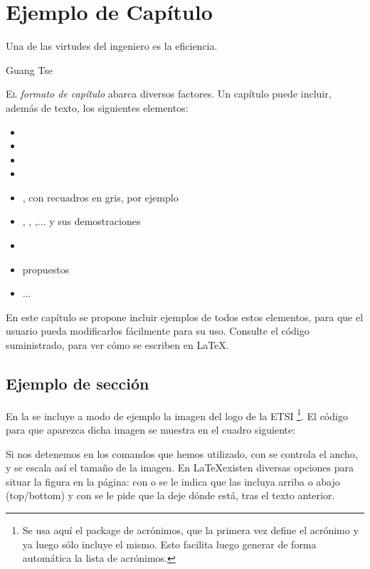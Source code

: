 \chapter{Ejemplo de Capítulo}
\pagestyle{esitscCD}
\epigraph{ Una de las virtudes del ingeniero es la eficiencia.  }{Guang Tse}

\lettrine[lraise=-0.1, lines=2, loversize=0.25]{E}l \emph{formato de capítulo } abarca diversos factores. Un capítulo puede incluir, además de texto, los siguientes elementos:

\begin{itemize}\itemsep1pt \parskip0pt 
\item {}
\item {}
\item {}
\item {}
\item {}, con recuadros en gris, por ejemplo
\item {}, , ,... y sus demostraciones
\item {}
\item {} propuestos
\item ...
\end{itemize}

En este capítulo se propone incluir ejemplos de todos estos elementos, para que el usuario pueda modificarlos fácilmente para su uso. Consulte el código suministrado, para ver cómo se escriben en \LaTeX.

\section{Ejemplo de sección}
%
En la  se incluye a modo de ejemplo la imagen del logo de la \gls{ETSI} \footnote{Se usa aquí el package de acrónimos, que la primera vez define el acrónimo y ya luego sólo incluye el mismo. Esto facilita luego generar de forma automática la lista de acrónimos.}. El código para que aparezca dicha imagen se muestra en el cuadro siguiente:



Si nos detenemos en los comandos que hemos utilizado, con  se controla el ancho, y se escala así el tamaño de la imagen. En \LaTeX existen diversas opciones para situar la figura en la página: con  o  se le indica que las incluya arriba o abajo (top/bottom) y con \ttcolor{!} se le pide que la deje dónde está, tras el texto anterior.


